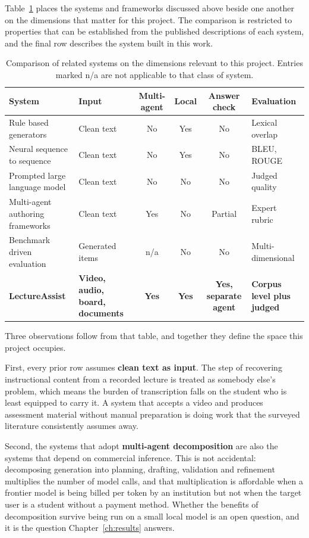 Table~\ref{tab:related} places the systems and frameworks discussed above beside
one another on the dimensions that matter for this project. The comparison is
restricted to properties that can be established from the published descriptions
of each system, and the final row describes the system built in this work.

\begin{table}[H]
\centering
\caption{Comparison of related systems on the dimensions relevant to this
project. Entries marked n/a are not applicable to that class of system.}
\label{tab:related}
\footnotesize
\setlength{\tabcolsep}{4pt}
\begin{tabular}{|p{2.6cm}|p{2.5cm}|c|c|c|p{2.4cm}|}
\hline
\textbf{System} & \textbf{Input} & \textbf{Multi-agent} & \textbf{Local}
 & \textbf{Answer check} & \textbf{Evaluation} \\
\hline
Rule based generators & Clean text & No & Yes & No &
Lexical overlap \\
\hline
Neural sequence to sequence & Clean text & No & Yes & No &
BLEU, ROUGE \\
\hline
Prompted large language model & Clean text & No & No & No &
Judged quality \\
\hline
Multi-agent authoring frameworks & Clean text & Yes & No & Partial &
Expert rubric \\
\hline
Benchmark driven evaluation & Generated items & n/a & No & No &
Multi-dimensional \\
\hline
\textbf{LectureAssist} & \textbf{Video, audio, board, documents} &
\textbf{Yes} & \textbf{Yes} & \textbf{Yes, separate agent} &
\textbf{Corpus level plus judged} \\
\hline
\end{tabular}
\end{table}

Three observations follow from that table, and together they define the space
this project occupies.

First, every prior row assumes \textbf{clean text as input}. The step of
recovering instructional content from a recorded lecture is treated as somebody
else's problem, which means the burden of transcription falls on the student who
is least equipped to carry it. A system that accepts a video and produces
assessment material without manual preparation is doing work that the surveyed
literature consistently assumes away.

Second, the systems that adopt \textbf{multi-agent decomposition} are also the
systems that depend on commercial inference. This is not accidental: decomposing
generation into planning, drafting, validation and refinement multiplies the
number of model calls, and that multiplication is affordable when a frontier
model is being billed per token by an institution but not when the target user
is a student without a payment method. Whether the benefits of decomposition
survive being run on a small local model is an open question, and it is the
question Chapter~\ref{ch:results} answers.

